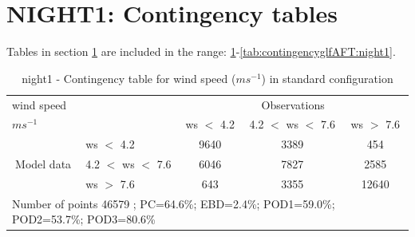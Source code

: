 \section{NIGHT1: Contingency tables}\label{sec:night1:cont}
Tables in section \ref{sec:night1:cont} are included in the range: \ref{tab:contingencywsBEF:night1}-\ref{tab:contingencyglfAFT:night1}.
\begin{table}[h!]
\begin{center}
\begin{tabular}{llccc}
\hline
{wind speed}                                       &                                                    & \multicolumn{3}{c}{Observations}                 \\
{$m s^{-1}$}                                       &                             & ws $<$ 4.2   & 4.2 $<$ ws $<$ 7.6 & ws $>$ 7.6 \\
\hline
\multicolumn{1}{c}{\multirow{3}{*}{Model data}}  & ws $<$ 4.2             & 9640                & 3389                       & 454              \\
                                                 & 4.2  $<$ ws $<$ 7.6 & 6046                & 7827                       & 2585              \\
                                                 & ws $>$ 7.6             & 643                & 3355                       & 12640              \\
\hline 
\multicolumn{5}{l}{ Number of points        46579 ; PC=64.6\%; EBD=2.4\%; POD1=59.0\%; POD2=53.7\%; POD3=80.6\%}                 \\
\end{tabular}
\end{center}
\caption{night1 - Contingency table for {wind speed} ($m s^{-1}$) in standard configuration}
\label{tab:contingencywsBEF:night1}
\end{table}
